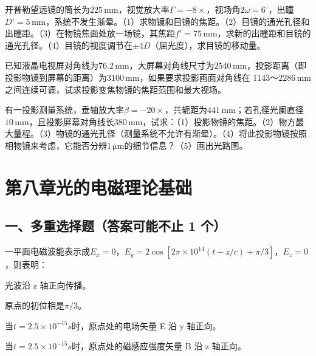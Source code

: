 \documentclass[padl, analysis, notocnum]{ExBook}
\newcommand{\answerarea}[1][3.5cm]{%
  \par\vspace{1mm}%
  \noindent{\color{themeColor!35}\rule{\linewidth}{0.4pt}}\par
  \noindent\begin{minipage}[t][#1][t]{\linewidth}\vspace{0pt}\end{minipage}\par
  \noindent{\color{themeColor!35}\rule{\linewidth}{0.4pt}}\par
}
\begin{document}
\begin{qitems}[startnum=9]
\qitem 开普勒望远镜的筒长为$225\,\mathrm{mm}$，视觉放大率$\Gamma =-8\times$，视场角$2\omega =6^{\circ}$，出瞳$D'=5\,\mathrm{mm}$，系统不发生渐晕。（1）求物镜和目镜的焦距。（2）目镜的通光孔径和出瞳距。（3）在物镜焦面处放一场镜，其焦距$f'=75\,\mathrm{mm}$，求新的出瞳距和目镜的通光孔径。（4）目镜的视度调节在$\pm 4D$（屈光度），求目镜的移动量。
\label{q:171:start}
\answerarea[7.0cm]
\label{q:171:end}
\end{qitems}

\begin{qitems}[startnum=10]
\qitem 已知液晶电视屏对角线为$76.2\,\mathrm{mm}$，大屏幕对角线尺寸为$2540\,\mathrm{mm}$，投影距离（即投影物镜到屏幕的距离）为$3100\,\mathrm{mm}$，如果要求投影画面对角线在 1143～$2286\,\mathrm{mm}$之间连续可调，试求投影变焦物镜的焦距范围和最大视场。
\label{q:172:start}
\answerarea[7.0cm]
\label{q:172:end}
\end{qitems}

\begin{qitems}[startnum=11]
\qitem 有一投影测量系统，垂轴放大率$\beta =-20\times$，共轭距为$441\,\mathrm{mm}$；若孔径光阑直径$10\,\mathrm{mm}$，且投影屏幕对角线长$380\,\mathrm{mm}$，试求：（1）投影物镜的焦距。（2）物方最大量程。（3）物镜的通光孔径（测量系统不允许有渐晕）。（4）将此投影物镜按照相物镜来考虑，它能否分辨$1\,\mathrm{\mu m}$的细节信息？（5）画出光路图。
\label{q:173:start}
\answerarea[7.0cm]
\label{q:173:end}
\end{qitems}

\section{第八章\quad 光的电磁理论基础}
\subsection{一、多重选择题（答案可能不止 1 个）}
\begin{qitems}[startnum=1]
\qitem 一平面电磁波能表示成$E_{x}=0$，$E_{y}=2\cos [2\pi \times 10^{14}(t-z/c)+\pi /3]$，$E_{z}=0$，则表明：
\par\noindent\hspace{2em}光波沿 z 轴正向传播。
\par\noindent\hspace{2em}原点的初位相是$\pi /3$。
\par\noindent\hspace{2em}当$t=2.5\times 10^{-15}s$时，原点处的电场矢量 E 沿 y 轴正向。
\par\noindent\hspace{2em}当$t=2.5\times 10^{-15}s$时，原点处的磁感应强度矢量 B 沿 z 轴正向。
\label{q:174:start}
\answerarea[4.0cm]
\label{q:174:end}
\end{qitems}
\end{document}

